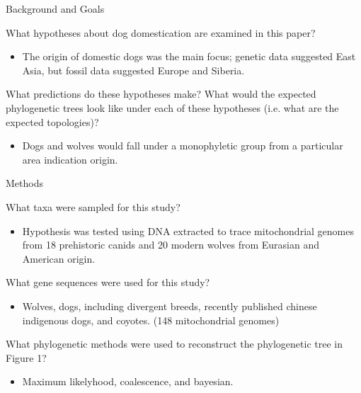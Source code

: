 \documentclass[12pt,a4paper]{article}
\begin{document}
\begin{itemize}
    \item Background and Goals
        \begin{itemize}
            {\color{darklc} \item What hypotheses about dog domestication are examined in this paper?}
                \begin{itemize}
                    \item The origin of domestic dogs was the main focus; genetic data suggested East Asia, but fossil data suggested Europe and Siberia. 
                \end{itemize}
            {\color{darklc} \item  What predictions do these hypotheses make? What would the expected phylogenetic trees look like under each of these hypotheses (i.e. what are the expected topologies)?}
                \begin{itemize}
                    \item Dogs and wolves would fall under a monophyletic group from a particular area indication origin.
                \end{itemize}
        \end{itemize}
    \item Methods
        \begin{itemize}
            {\color{darklc} \item  What taxa were sampled for this study?} 
                \begin{itemize}
                    \item Hypothesis was tested using DNA extracted to trace mitochondrial genomes from 18 prehistoric canids and 20 modern wolves from Eurasian and American origin. 
                \end{itemize}
            {\color{darklc} \item  What gene sequences were used for this study?}
                \begin{itemize}
                    \item Wolves, dogs, including divergent breeds, recently published chinese indigenous dogs, and coyotes. (148 mitochondrial genomes)
                \end{itemize}
            {\color{darklc} \item  What phylogenetic methods were used to reconstruct the phylogenetic tree in Figure 1?}
                \begin{itemize}
                    \item Maximum likelyhood, coalescence, and bayesian.

\end{itemize}
\end{itemize}
\end{itemize}
\end{document}
